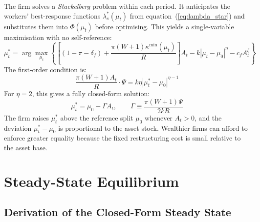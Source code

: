 \documentclass[12pt,a4paper]{article}
\begin{document}
The firm solves a \emph{Stackelberg} problem within each period.
It anticipates the workers' best-response functions
$\lambda_s^*(\mu_t)$ from equation~(\ref{eq:lambda_star})
and substitutes them into $\Phi(\mu_t)$ before optimising.
This yields a single-variable maximisation with no self-reference:
\begin{equation}
  \mu_t^* = \arg\max_{\mu_t}\left\{
    \left[(1-\pi-\delta_f) + \frac{\pi(W+1)\kappa^{\min}(\mu_t)}{R}\right]A_t
    - k|\mu_t-\mu_0|^\eta - c_f A_t^\xi
  \right\}
  \label{eq:firm_opt}
\end{equation}
The first-order condition is:
\begin{equation}
  \frac{\pi(W+1)A_t}{R}\cdot\Psi = k\eta|\mu_t^*-\mu_0|^{\eta-1}
  \label{eq:firm_foc}
\end{equation}
For $\eta = 2$, this gives a fully closed-form solution:
\begin{equation}
  \mu_t^* = \mu_0 + \Gamma A_t,
  \qquad
  \Gamma \equiv \frac{\pi(W+1)\Psi}{2kR}
  \label{eq:mu_opt}
\end{equation}
The firm raises $\mu_t^*$ above the reference split $\mu_0$ whenever
$A_t > 0$, and the deviation $\mu_t^* - \mu_0$ is proportional to
the asset stock. Wealthier firms can afford to enforce greater equality
because the fixed restructuring cost is small relative to the asset base.

\section{Steady-State Equilibrium}

\subsection{Derivation of the Closed-Form Steady State}
\end{document}
